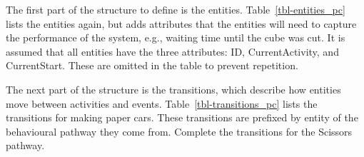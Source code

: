 \documentclass[
  10pt,
  a4paperpaper,
  DIV=11,
  numbers=noendperiod,
  oneside]{scrreprt}
\begin{document}
The first part of the structure to define is the entities.
Table~\ref{tbl-entities_pc} lists the entities again, but adds
attributes that the entities will need to capture the performance of the
system, e.g., waiting time until the cube was cut. It is assumed that
all entities have the three attributes: ID, CurrentActivity, and
CurrentStart. These are omitted in the table to prevent repetition.

\begin{table}

\caption{\label{tbl-entities_pc}List of Entities}


\end{table}%

The next part of the structure is the transitions, which describe how
entities move between activities and events.
Table~\ref{tbl-transitions_pc} lists the transitions for making paper
cars. These transitions are prefixed by entity of the behavioural
pathway they come from. Complete the transitions for the Scissors
pathway.
\end{document}
